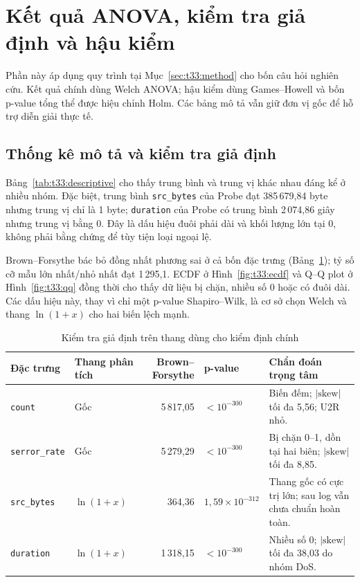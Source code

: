 \documentclass[../main.tex]{subfiles}
\begin{document}
\section{Kết quả ANOVA, kiểm tra giả định và hậu kiểm}
\label{sec:t33:result}

Phần này áp dụng quy trình tại Mục~\ref{sec:t33:method} cho bốn câu hỏi nghiên
cứu. Kết quả chính dùng Welch ANOVA; hậu kiểm dùng Games--Howell và bốn p-value tổng thể
được hiệu chỉnh Holm. Các bảng mô tả vẫn giữ đơn vị gốc để hỗ trợ diễn giải thực tế.

\subsection{Thống kê mô tả và kiểm tra giả định}

Bảng~\ref{tab:t33:descriptive} cho thấy trung bình và trung vị khác nhau đáng kể ở
nhiều nhóm. Đặc biệt, trung bình \texttt{src\_bytes} của Probe đạt 385\,679,84 byte nhưng
trung vị chỉ là 1 byte; \texttt{duration} của Probe có trung bình 2\,074,86 giây nhưng
trung vị bằng 0. Đây là dấu hiệu đuôi phải dài và khối lượng lớn tại 0, không phải bằng
chứng để tùy tiện loại ngoại lệ.

Brown--Forsythe bác bỏ đồng nhất phương sai ở cả bốn đặc trưng
(Bảng~\ref{tab:t33:assumptions}); tỷ số cỡ mẫu lớn nhất/nhỏ nhất đạt 1\,295,1. ECDF ở
Hình~\ref{fig:t33:ecdf} và Q--Q plot ở Hình~\ref{fig:t33:qq} đồng thời cho thấy dữ
liệu bị chặn, nhiều số 0 hoặc có đuôi dài. Các dấu hiệu này, thay vì chỉ một p-value
Shapiro--Wilk, là cơ sở chọn Welch và thang $\ln(1+x)$ cho hai biến lệch mạnh.

\begin{table}[H]
\centering
\caption{Kiểm tra giả định trên thang dùng cho kiểm định chính}
\label{tab:t33:assumptions}
\small
\setlength{\tabcolsep}{4pt}
\begin{tabularx}{\textwidth}{l l r l X}
\toprule
Đặc trưng & Thang phân tích & Brown--Forsythe & p-value & Chẩn đoán trọng tâm \\
\midrule
\texttt{count} & Gốc & 5\,817,05 & $<10^{-300}$ & Biến đếm; $|\mathrm{skew}|$ tối đa 5,56; U2R nhỏ. \\
\texttt{serror\_rate} & Gốc & 5\,279,29 & $<10^{-300}$ & Bị chặn 0--1, dồn tại hai biên; $|\mathrm{skew}|$ tối đa 8,85. \\
\texttt{src\_bytes} & $\ln(1+x)$ & 364,36 & $1{,}59\times10^{-312}$ & Thang gốc có cực trị lớn; sau log vẫn chưa chuẩn hoàn toàn. \\
\texttt{duration} & $\ln(1+x)$ & 1\,318,15 & $<10^{-300}$ & Nhiều số 0; $|\mathrm{skew}|$ tối đa 38,03 do nhóm DoS. \\
\bottomrule
\end{tabularx}
\end{table}
\end{document}
